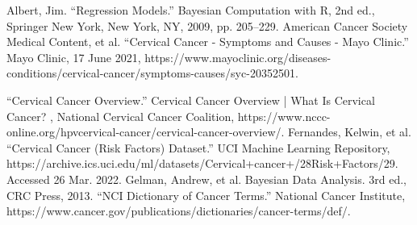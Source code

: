 \documentclass[12pt]{article}
\numberwithin{equation}{section}
\begin{document}
\newpage
\begin{thebibliography}{}
Albert, Jim. “Regression Models.” Bayesian Computation with R, 2nd ed., Springer New York, New York, NY, 2009, pp. 205–229. 
 American Cancer Society Medical Content, et al. “Cervical Cancer - Symptoms and Causes - Mayo Clinic.” Mayo Clinic, 17 June 2021, https://www.mayoclinic.org/diseases-conditions/cervical-cancer/symptoms-causes/syc-20352501.

 “Cervical Cancer Overview.” Cervical Cancer Overview | What Is Cervical Cancer? , National Cervical Cancer Coalition, https://www.nccc-online.org/hpvcervical-cancer/cervical-cancer-overview/. 
 Fernandes, Kelwin, et al. “Cervical Cancer (Risk Factors) Dataset.” UCI Machine Learning Repository, https://archive.ics.uci.edu/ml/datasets/Cervical+cancer+/28Risk+Factors/29. Accessed 26 Mar. 2022. 
Gelman, Andrew, et al. Bayesian Data Analysis. 3rd ed., CRC Press, 2013. 
“NCI Dictionary of Cancer Terms.” National Cancer Institute, https://www.cancer.gov/publications/dictionaries/cancer-terms/def/. 


\end{thebibliography}
\end{document}
